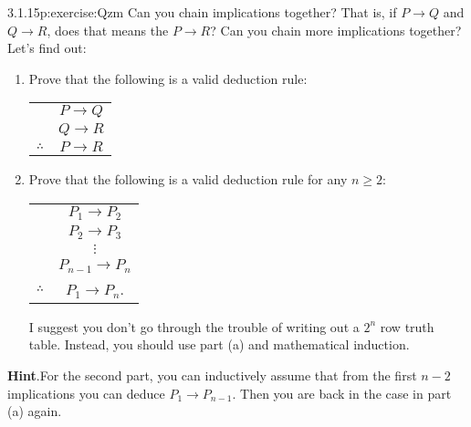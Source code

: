 \documentclass[twoside,11pt,]{book}
\newcommand{\blocktitlefont}{\relax}
\newcommand{\tabularfont}{\relax}
\numberwithin{equation}{chapter}
\newcommand{\hrulethin}  {\noalign{\hrule height 0.04em}}
\newcommand{\imp}{\rightarrow}
\begin{document}
\begin{divisionsolution}{3.1.15}{}{p:exercise:Qzm}%
Can you chain implications together? That is, if \(P \imp Q\) and \(Q \imp R\), does that means the \(P \imp R\)? Can you chain more implications together? Let's find out:%
\begin{enumerate}[label=(\alph*)]
\item{}Prove that the following is a valid deduction rule:%
\begin{sidebyside}{1}{0}{0}{0}%
\begin{sbspanel}{1}%
{\centering%
{\tabularfont%
\begin{tabular}{cc}
&\(P \imp Q\)\tabularnewline[0pt]
&\(Q \imp R\)\tabularnewline\hrulethin
\(\therefore\)&\(P \imp R\)
\end{tabular}
}%
\par}
\end{sbspanel}%
\end{sidebyside}%
\item{}Prove that the following is a valid deduction rule for any \(n \ge 2\):%
\begin{sidebyside}{1}{0}{0}{0}%
\begin{sbspanel}{1}%
{\centering%
{\tabularfont%
\begin{tabular}{cc}
&\(P_1 \imp P_2\)\tabularnewline[0pt]
&\(P_2 \imp P_3\)\tabularnewline[0pt]
&\(\vdots\)\tabularnewline[0pt]
&\(P_{n-1} \imp P_n\)\tabularnewline\hrulethin
\(\therefore\)&\(P_1 \imp P_n\).
\end{tabular}
}%
\par}
\end{sbspanel}%
\end{sidebyside}%
\par
I suggest you don't go through the trouble of writing out a \(2^n\) row truth table. Instead, you should use part (a) and mathematical induction. %
\end{enumerate}
%
\par\smallskip%
\noindent\textbf{\blocktitlefont Hint}.\quad{}For the second part, you can inductively assume that from the first \(n-2\) implications you can deduce \(P_1 \imp P_{n-1}\).  Then you are back in the case in part (a) again.%
\end{divisionsolution}%
\end{document}
